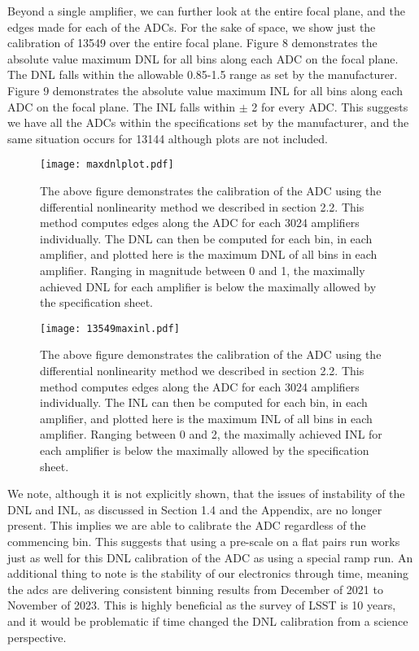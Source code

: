 \documentclass[11pt, letterpaper]{article}
\begin{document}
Beyond a single amplifier, we can further look at the entire focal plane, and the edges made for each of the ADCs. 
For the sake of space, we show just the calibration of 13549 over the entire focal plane. 
Figure 8 demonstrates the absolute value maximum DNL for all bins along each ADC on the focal plane. 
The DNL falls within the allowable 0.85-1.5 range as set by the manufacturer.  
Figure 9 demonstrates the absolute value maximum INL for all bins along each ADC on the focal plane. 
The INL falls within $\pm$ 2 for every ADC. 
This suggests we have all the ADCs within the specifications set by the manufacturer, and the same situation occurs for 13144 although plots are not included. 
\begin{figure}
	\texttt{[image: maxdnlplot.pdf]}
	\caption{The above figure demonstrates the calibration of the ADC using the differential nonlinearity method we described in section 2.2. This method computes edges along the ADC for each 3024 amplifiers individually. The DNL can then be computed for each bin, in each amplifier, and plotted here is the maximum DNL of all bins in each amplifier. Ranging in magnitude between 0 and 1, the maximally achieved DNL for each amplifier is below the maximally allowed by the specification sheet. }
\end{figure}
\begin{figure}
	\texttt{[image: 13549maxinl.pdf]}
	\caption{The above figure demonstrates the calibration of the ADC using the differential nonlinearity method we described in section 2.2. This method computes edges along the ADC for each 3024 amplifiers individually. The INL can then be computed for each bin, in each amplifier, and plotted here is the maximum INL of all bins in each amplifier. Ranging between 0 and 2, the maximally achieved INL for each amplifier is below the maximally allowed by the specification sheet.}
\end{figure}
\indent


We note, although it is not explicitly shown, that the issues of instability of the DNL and INL, as discussed in Section 1.4 and the Appendix, are no longer present. 
This implies we are able to calibrate the ADC regardless of the commencing bin. 
This suggests that using a pre-scale on a flat pairs run works just as well for this DNL calibration of the ADC as using a special ramp run. 
An additional thing to note is the stability of our electronics through time, meaning the adcs are delivering consistent binning results from December of 2021 to November of 2023. 
This is highly beneficial as the survey of LSST is 10 years, and it would be problematic if time changed the DNL calibration from a science perspective. 
\end{document}
